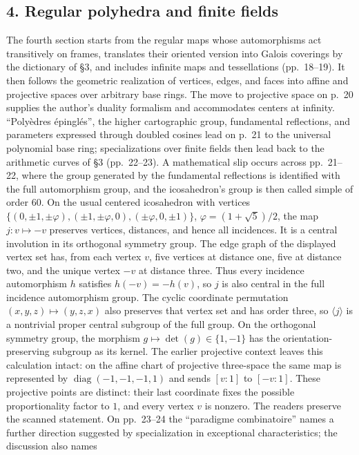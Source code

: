 \documentclass[11pt,a4paper]{article}
\begin{document}
\subsection*{4. Regular polyhedra and finite fields}
The fourth section starts from the regular maps whose automorphisms act
transitively on frames, translates their oriented version into Galois
coverings by the dictionary of \S3, and includes infinite maps and
tessellations (pp.~18--19). It then follows the geometric realization of
vertices, edges, and faces into affine and projective spaces over arbitrary
base rings. The move to projective space on p.~20 supplies the author's
duality formalism and accommodates centers at infinity. ``Polyèdres
épinglés'', the higher cartographic group, fundamental reflections, and
parameters expressed through doubled cosines lead on p.~21 to the
universal polynomial base ring; specializations over finite fields then
lead back to the arithmetic curves of \S3 (pp.~22--23). A mathematical
slip occurs across pp.~21--22, where the group generated by the fundamental
reflections is identified with the full automorphism group, and the
icosahedron's group is then called simple of order 60. On the usual
centered icosahedron with vertices
$\{(0,\pm1,\pm\varphi),(\pm1,\pm\varphi,0),(\pm\varphi,0,\pm1)\}$,
$\varphi=(1+\sqrt5)/2$, the map $j:v\mapsto-v$ preserves vertices,
distances, and hence all incidences. It is a central involution in its
orthogonal symmetry group. The edge graph of the displayed vertex set
has, from each vertex $v$, five vertices at distance one, five at
distance two, and the unique vertex $-v$ at distance three. Thus every
incidence automorphism $h$ satisfies $h(-v)=-h(v)$, so $j$ is also
central in the full incidence automorphism group. The cyclic coordinate permutation
$(x,y,z)\mapsto(y,z,x)$ also preserves that vertex set and has order three,
so $\langle j\rangle$ is a nontrivial proper central subgroup of the full
group. On the orthogonal symmetry group, the morphism
$g\mapsto\det(g)\in\{1,-1\}$ has the orientation-preserving subgroup
as its kernel. The earlier projective
context leaves this calculation intact: on the affine chart of projective
three-space the same map is represented by
$\operatorname{diag}(-1,-1,-1,1)$ and sends $[v:1]$ to $[-v:1]$.
These projective points are distinct: their last coordinate fixes the
possible proportionality factor to $1$, and every vertex $v$ is nonzero.
The readers preserve the scanned statement. On pp.~23--24 the
``paradigme combinatoire'' names a further direction suggested by
specialization in exceptional characteristics; the discussion also names
\end{document}
